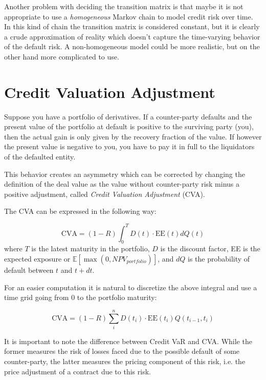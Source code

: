 Another problem with deciding the transition matrix is that maybe it is not appropriate to use a \emph{homogeneous} Markov chain to model credit risk over time. In this kind of chain the transition matrix is considered constant, but it is clearly a crude approximation of reality which doesn't capture the time-varying behavior of the default risk. A non-homogeneous model could be more realistic, but on the other hand more complicated to use. 

\section{Credit Valuation Adjustment}
\label{credit-valuation-adjustment}

Suppose you have a portfolio of derivatives. If a counter-party defaults and the present value of the portfolio at default is positive to the surviving party (you), then the actual gain is only given by the recovery fraction of the value. If however the present value is negative to you, you have to pay it in full to the liquidators of the defaulted entity.

This behavior creates an asymmetry which can be corrected by changing the definition of the deal value as the value without counter-party risk minus a positive adjustment, called \emph{Credit Valuation Adjustment} (CVA).

The CVA can be expressed in the following way:

\begin{equation}
\text{CVA} = (1-R) \int_0^T D(t) \cdot \textrm{EE}(t) dQ(t)
\label{eq:cva}
\end{equation}
where $T$ is the latest maturity in the portfolio, $D$ is the discount factor, EE is the expected exposure or $\mathbb{E}[\max(0, NPV_{portfolio})]$, and $dQ$ is the probability of default between $t$ and $t+dt$.

For an easier computation it is natural to discretize the above integral and use a time grid going from 0 to the portfolio maturity:

\begin{equation}
\text{CVA} = (1-R) \sum_i^n D(t_i) \cdot \mathrm{EE}(t_i) Q(t_{i-1}, t_i)
\label{eq:cva_discrete}
\end{equation}

It is important to note the difference between Credit VaR and CVA. While the former measures the risk of losses faced due to the possible default of some counter-party, the latter measures the pricing component of this risk, i.e. the price adjustment of a contract due to this risk.

